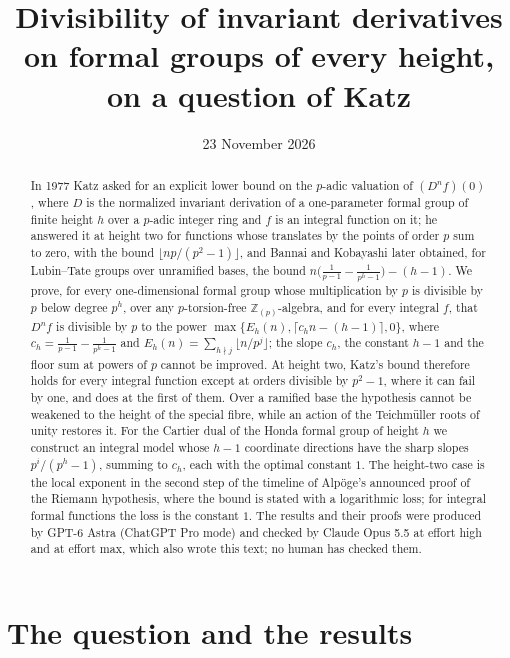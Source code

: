 \documentclass[11pt]{amsart}
\title[Invariant derivatives at every height]{Divisibility of invariant derivatives on formal groups of every height, on a question of Katz}
\author{}
\date{23 November 2026}
\theoremstyle{definition}
\theoremstyle{remark}
\newcommand{\Z}{\mathbb Z}
\begin{document}
\begin{abstract}
In 1977 Katz asked for an explicit lower bound on the $p$-adic valuation of $(D^nf)(0)$, where $D$ is the normalized invariant derivation of a one-parameter formal group of finite height $h$ over a $p$-adic integer ring and $f$ is an integral function on it; he answered it at height two for functions whose translates by the points of order $p$ sum to zero, with the bound $\lfloor np/(p^2-1)\rfloor$, and Bannai and Kobayashi later obtained, for Lubin--Tate groups over unramified bases, the bound $n\bigl(\frac1{p-1}-\frac1{p^h-1}\bigr)-(h-1)$. We prove, for every one-dimensional formal group whose multiplication by $p$ is divisible by $p$ below degree $p^h$, over any $p$-torsion-free $\Z_{(p)}$-algebra, and for every integral $f$, that $D^nf$ is divisible by $p$ to the power $\max\{E_h(n),\lceil c_hn-(h-1)\rceil,0\}$, where $c_h=\frac1{p-1}-\frac1{p^h-1}$ and $E_h(n)=\sum_{h\nmid j}\lfloor n/p^j\rfloor$; the slope $c_h$, the constant $h-1$ and the floor sum at powers of $p$ cannot be improved. At height two, Katz's bound therefore holds for every integral function except at orders divisible by $p^2-1$, where it can fail by one, and does at the first of them. Over a ramified base the hypothesis cannot be weakened to the height of the special fibre, while an action of the Teichm\"uller roots of unity restores it. For the Cartier dual of the Honda formal group of height $h$ we construct an integral model whose $h-1$ coordinate directions have the sharp slopes $p^i/(p^h-1)$, summing to $c_h$, each with the optimal constant $1$. The height-two case is the local exponent in the second step of the timeline of Alp\"oge's announced proof of the Riemann hypothesis, where the bound is stated with a logarithmic loss; for integral formal functions the loss is the constant $1$. The results and their proofs were produced by GPT-6 Astra (ChatGPT Pro mode) and checked by Claude Opus 5.5 at effort high and at effort max, which also wrote this text; no human has checked them.
\end{abstract}

\maketitle

\section{The question and the results}
\end{document}
